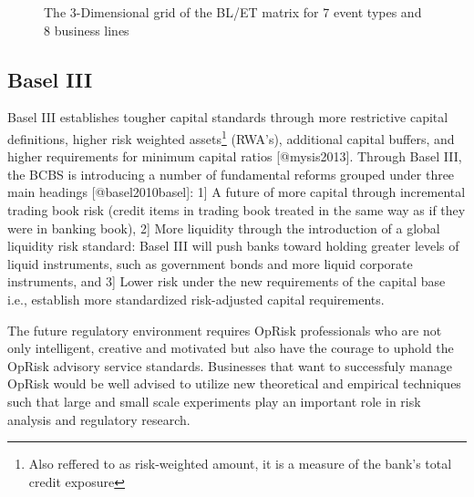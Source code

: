 \documentclass[
]{article}
\begin{document}
\begin{figure}
\caption{The 3-Dimensional grid of the BL/ET matrix for 7 event types and 8 business lines}
\end{figure}

\subsection{Basel III}

Basel III establishes tougher capital standards through more restrictive
capital definitions, higher risk weighted
assets\footnote{Also reffered to as risk-weighted amount, it is a measure of the bank's total credit exposure}
(RWA's), additional capital buffers, and higher requirements for minimum
capital ratios {[}@mysis2013{]}. Through Basel III, the BCBS is
introducing a number of fundamental reforms grouped under three main
headings {[}@basel2010basel{]}: 1{]} A future of more capital through
incremental trading book risk (credit items in trading book treated in
the same way as if they were in banking book), 2{]} More liquidity
through the introduction of a global liquidity risk standard: Basel III
will push banks toward holding greater levels of liquid instruments,
such as government bonds and more liquid corporate instruments, and 3{]}
Lower risk under the new requirements of the capital base i.e.,
establish more standardized risk-adjusted capital requirements.\medskip

The future regulatory environment requires OpRisk professionals who are
not only intelligent, creative and motivated but also have the courage
to uphold the OpRisk advisory service standards. Businesses that want to
successfuly manage OpRisk would be well advised to utilize new
theoretical and empirical techniques such that large and small scale
experiments play an important role in risk analysis and regulatory
research.
\end{document}
